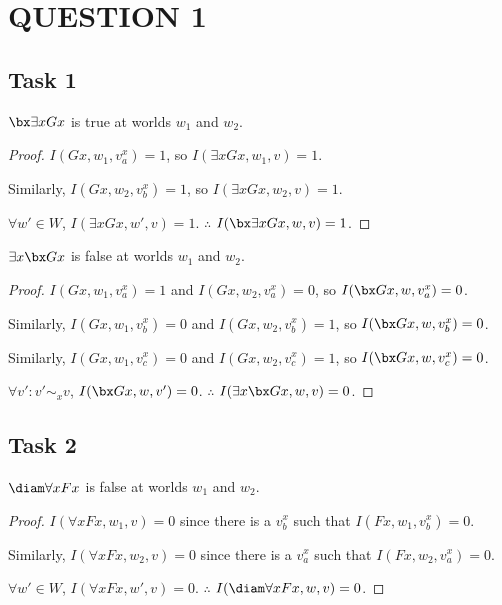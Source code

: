 \singlespacing

\section*{QUESTION 1}

\subsection*{Task 1}
\begin{claim}
$\bx \exists x Gx$ is true at worlds $w_1$ and $w_2$.
\end{claim}

\begin{proof}
$I(Gx, w_1, v^x_a) = 1$, so $I(\exists x Gx, w_1, v) = 1$.

Similarly, $I(Gx, w_2, v^x_b) = 1$, so $I(\exists x Gx, w_2, v) = 1$.

$\forall w' \in W$, $I(\exists x Gx, w', v) = 1$. $\therefore$ $I(\bx \exists x Gx, w, v) = 1$.    
\end{proof}

\begin{claim}
$\exists x \bx Gx$ is false at worlds $w_1$ and $w_2$.
\end{claim}

\begin{proof}
$I(Gx, w_1, v^x_a) = 1$ and $I(Gx, w_2, v^x_a) = 0$, so $I(\bx Gx, w, v^x_a) = 0$.

Similarly, $I(Gx, w_1, v^x_b) = 0$ and $I(Gx, w_2, v^x_b) = 1$, so $I(\bx Gx, w, v^x_b) = 0$.

Similarly, $I(Gx, w_1, v^x_c) = 0$ and $I(Gx, w_2, v^x_c) = 1$, so $I(\bx Gx, w, v^x_c) = 0$.

$\forall v': v' \sim_x v$, $I(\bx Gx, w, v') = 0$. $\therefore$ $I(\exists x \bx Gx, w, v) = 0$.
\end{proof}

\subsection*{Task 2}

\begin{claim}
$\diam \forall x Fx$ is false at worlds $w_1$ and $w_2$.
\end{claim}

\begin{proof}
$I(\forall x Fx, w_1, v) = 0$ since there is a $v^x_b$ such that $I(Fx, w_1, v^x_b) = 0$.

Similarly, $I(\forall x Fx, w_2, v) = 0$ since there is a $v^x_a$ such that $I(Fx, w_2, v^x_a) = 0$.

$\forall w' \in W$, $I(\forall x Fx, w', v) = 0$. $\therefore$ $I(\diam \forall x Fx, w, v) = 0$.
\end{proof}

